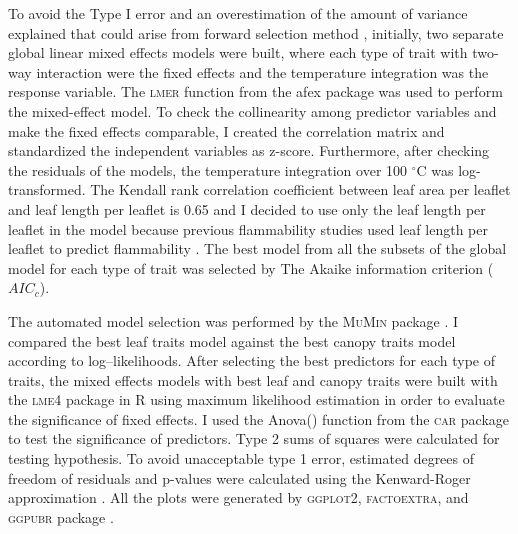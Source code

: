\documentclass{ttuthes2007}
\newcommand{\pkg}[1]{\textsc{#1}}
\begin{document}

To avoid the  Type I error and an overestimation of the amount of variance explained that could arise from forward selection method \citep{blanchet2008forward}, initially, two separate global linear mixed effects models were built, where each type of trait with two-way interaction were the fixed effects and the temperature integration was the response variable.
The \pkg{lmer} function from the afex package \citep{singmann2015packageafex,afexluke2017evaluating} was used to perform the mixed-effect model.
To check the collinearity among predictor variables and make the fixed effects comparable, I created the correlation matrix and standardized the independent variables as z-score. Furthermore, after checking the residuals of the models, the temperature integration over 100 $^{\circ}$C was log-transformed. 
The Kendall rank correlation coefficient between leaf area per leaflet and leaf length per leaflet is 0.65 and I decided to use only the leaf length per leaflet in the model because previous flammability studies used leaf length per leaflet to predict flammability \citep{alam2020shoot}. 
The best model from all the subsets of the global model for each type of trait was selected by The Akaike information criterion ($AIC_{c}$).

The automated model selection was performed by the \pkg{MuMin} package \citep{barton2015packagemumin}. I compared the best leaf traits model against the best canopy traits model according to log--likelihoods. After selecting the best predictors for each type of traits, the mixed effects models with best leaf and canopy traits were built with the \pkg{lme4} package in R \citep{bates2009package} using maximum likelihood estimation in order to evaluate the significance of fixed effects. I used the Anova() function from the \pkg{car} package \citep{fox2013hypothesis} to test the significance of predictors. Type  2  sums  of  squares  were  calculated  for  testing  hypothesis. To avoid unacceptable type 1 error, estimated degrees of freedom of residuals and p-values were calculated using the Kenward-Roger approximation \citep{kenward1997small}. All the plots were generated by \pkg{ggplot2}, \pkg{factoextra}, and \pkg{ggpubr} package \citep{wickham2016packageggplot2, kassambara2017packagefactoextra,kassambara2020package}.
\end{document}
